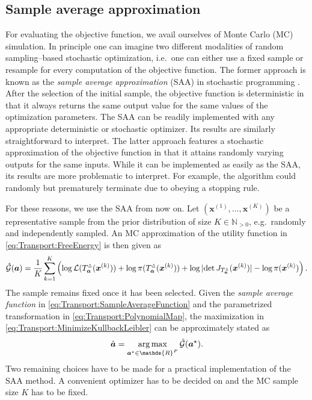 \subsection{Sample average approximation}
For evaluating the objective function, we avail ourselves of Monte Carlo (MC) simulation.
In principle one can imagine two different modalities of random sampling--based stochastic optimization,
i.e.\ one can either use a fixed sample or resample for every computation of the objective function.
The former approach is known as the \emph{sample average approximation} (SAA) in stochastic programming \cite{Optim:Kleywegt2002,Optim:Nemirovski2009}.
After the selection of the initial sample, the objective function is deterministic in that it always returns the same output value for the same values of the optimization parameters.
The SAA can be readily implemented with any appropriate deterministic or stochastic optimizer.
Its results are similarly straightforward to interpret.
The latter approach features a stochastic approximation of the objective function in that it attains randomly varying outputs for the same inputs.
While it can be implemented as easily as the SAA, its results are more problematic to interpret.
For example, the algorithm could randomly but prematurely terminate due to obeying a stopping rule.
\par %
For these reasons, we use the SAA from now on.
Let \((\bm{x}^{(1)},\ldots,\bm{x}^{(K)})\) be a representative sample from the prior distribution of size \(K \in \mathds{N}_{>0}\), e.g.\ randomly and independently sampled.
An MC approximation of the utility function in \cref{eq:Transport:FreeEnergy} is then given as
\begin{equation} \label{eq:Transport:SampleAverageFunction}
  \hat{\mathcal{G}}(\bm{a}) = \frac{1}{K} \sum\limits_{k=1}^K \left(
  \log \mathcal{L}(T_{\bm{a}}^\vartriangle(\bm{x}^{(k)})) + \log \pi(T_{\bm{a}}^\vartriangle(\bm{x}^{(k)}))
  + \log \, \lvert \det J_{T_{\bm{a}}^\vartriangle}(\bm{x}^{(k)}) \rvert - \log \pi(\bm{x}^{(k)}) \right).
\end{equation}
The sample remains fixed once it has been selected.
Given the \emph{sample average function} in \cref{eq:Transport:SampleAverageFunction} and the parametrized transformation in \cref{eq:Transport:PolynomialMap},
the maximization in \cref{eq:Transport:MinimizeKullbackLeibler} can be approximately stated as
\begin{equation} \label{eq:Transport:OptimizationSAA}
  \hat{\bm{\coeffM}} = \operatorname*{arg\,max}_{\bm{\coeffM}^\star \in \mathds{R}^P} \hat{\mathcal{G}}(\bm{\coeffM}^\star).
\end{equation}
Two remaining choices have to be made for a practical implementation of the SAA method.
A convenient optimizer has to be decided on and the MC sample size \(K\) has to be fixed.

